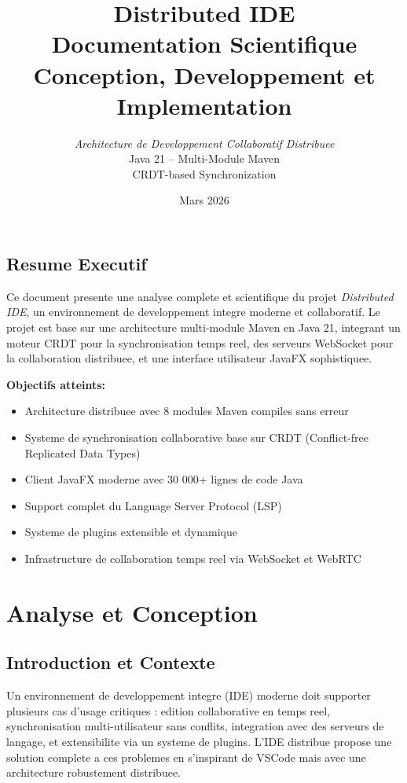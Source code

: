 \documentclass[11pt,a4paper,hidelinks]{book}
\title{\textbf{\LARGE Distributed IDE} \\ \Large Documentation Scientifique \\ \vspace{1cm} \normalsize Conception, Developpement et Implementation}
\author{\textit{Architecture de Developpement Collaboratif Distribuee} \\ Java 21 -- Multi-Module Maven \\ CRDT-based Synchronization}
\date{Mars 2026}
\begin{document}
\frontmatter
\maketitle

\tableofcontents

\newpage
\section*{Resume Executif}

Ce document presente une analyse complete et scientifique du projet \emph{Distributed IDE}, un environnement de developpement integre moderne et collaboratif. Le projet est base sur une architecture multi-module Maven en Java 21, integrant un moteur CRDT pour la synchronisation temps reel, des serveurs WebSocket pour la collaboration distribuee, et une interface utilisateur JavaFX sophistiquee.

\textbf{Objectifs atteints:}
\begin{itemize}
    \item Architecture distribuee avec 8 modules Maven compiles sans erreur
    \item Systeme de synchronisation collaborative base sur CRDT (Conflict-free Replicated Data Types)
    \item Client JavaFX moderne avec 30 000+ lignes de code Java
    \item Support complet du Language Server Protocol (LSP)
    \item Systeme de plugins extensible et dynamique
    \item Infrastructure de collaboration temps reel via WebSocket et WebRTC
\end{itemize}

\mainmatter


\chapter{Analyse et Conception}

\section{Introduction et Contexte}

Un environnement de developpement integre (IDE) moderne doit supporter plusieurs cas d'usage critiques : edition collaborative en temps reel, synchronisation multi-utilisateur sans conflits, integration avec des serveurs de langage, et extensibilite via un systeme de plugins. L'IDE distribue propose une solution complete a ces problemes en s'inspirant de VSCode mais avec une architecture robustement distribuee.
\end{document}
